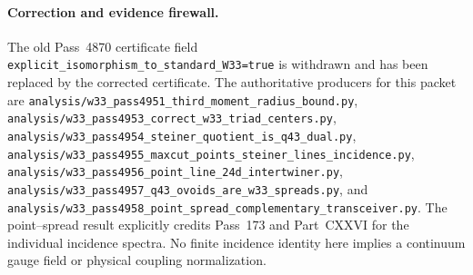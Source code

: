 \paragraph{Correction and evidence firewall.}
The old Pass~4870 certificate field
\texttt{explicit\_isomorphism\_to\_standard\_W33=true} is withdrawn and has
been replaced by the corrected certificate.  The authoritative producers for
this packet are
\texttt{analysis/w33\_pass4951\_third\_moment\_radius\_bound.py},
\texttt{analysis/w33\_pass4953\_correct\_w33\_triad\_centers.py},
\texttt{analysis/w33\_pass4954\_steiner\_quotient\_is\_q43\_dual.py},
\texttt{analysis/w33\_pass4955\_maxcut\_points\_steiner\_lines\_incidence.py},
\texttt{analysis/w33\_pass4956\_point\_line\_24d\_intertwiner.py},
\texttt{analysis/w33\_pass4957\_q43\_ovoids\_are\_w33\_spreads.py}, and
\texttt{analysis/w33\_pass4958\_point\_spread\_complementary\_transceiver.py}.
The point--spread result explicitly credits Pass~173 and Part~CXXVI for the
individual incidence spectra.  No finite incidence identity here implies a
continuum gauge field or physical coupling normalization.